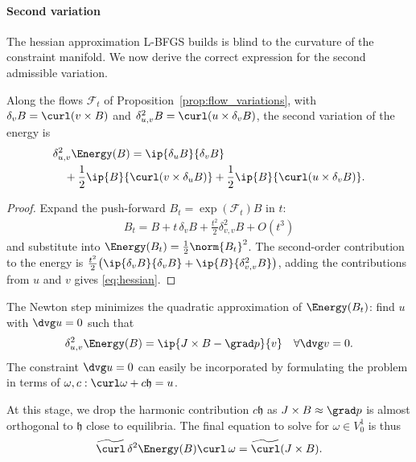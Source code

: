 \documentclass[%
 reprint,
 superscriptaddress,
 amsmath,amssymb,
 aps, nofootinbib, floatfix]{revtex4-2}
\begin{document}
\paragraph{Second variation}
The hessian approximation L-BFGS builds is blind to the curvature of the constraint manifold. We now derive the correct expression for the second admissible variation.
\begin{proposition}
    \label{prop:second_variation}
    Along the flows $\mathcal F_t$ of Proposition~\ref{prop:flow_variations}, with $\delta_v B = \curl(v \times B)$ and $\delta^2_{u,v} B = \curl(u \times \delta_v B)$, the second variation of the energy is
\begin{align}
\label{eq:hessian}
    &\delta^2_{u,v} \Energy(B) = \ip{\delta_u B}{\delta_v B} \\
    &\quad + \frac{1}{2} \ip{B}{\curl(v \times \delta_u B)} + \frac{1}{2} \ip{B}{\curl(u \times \delta_v B)} . \notag
\end{align}
\end{proposition}
\begin{proof}
    Expand the push-forward $B_t = \exp(\mathcal F_t) B$ in $t$: 
    \begin{align}
        B_t = B + t \, \delta_v B + \frac{t^2}{2} \delta^2_{v,v} B + O(t^3)
    \end{align}
    and substitute into $\Energy(B_t) = \frac12 \norm{B_t}^2$. The second-order contribution to the energy is $\frac{t^2}{2} \big( \ip{\delta_v B}{\delta_v B} + \ip{B}{\delta^2_{v,v} B} \big)$, adding the contributions from $u$ and $v$ gives \eqref{eq:hessian}.
\end{proof}
The Newton step minimizes the quadratic approximation of $\Energy(B_t)$: find $u$ with $\dvg u = 0$ such that
\begin{align}
    \delta^2_{u,v} \Energy(B) = \ip{J \times B - \grad p}{v} \quad \forall \dvg v = 0 .
\end{align}
The constraint $\dvg u = 0$ can easily be incorporated by formulating the problem in terms of $\omega, c: \curl \omega + c \mathfrak h = u$. 

At this stage, we drop the harmonic contribution $c \mathfrak h$ as $J \times B \approx \grad p$ is almost orthogonal to $\mathfrak h$ close to equilibria. The final equation to solve for $\omega \in V^1_0$ is thus
\begin{align}
    \label{eq:hessian_system}
    \widetilde{\curl} \, \delta^2 \Energy(B)  \curl \, \omega = \widetilde{\curl} (J \times B).      
\end{align}
\end{document}

